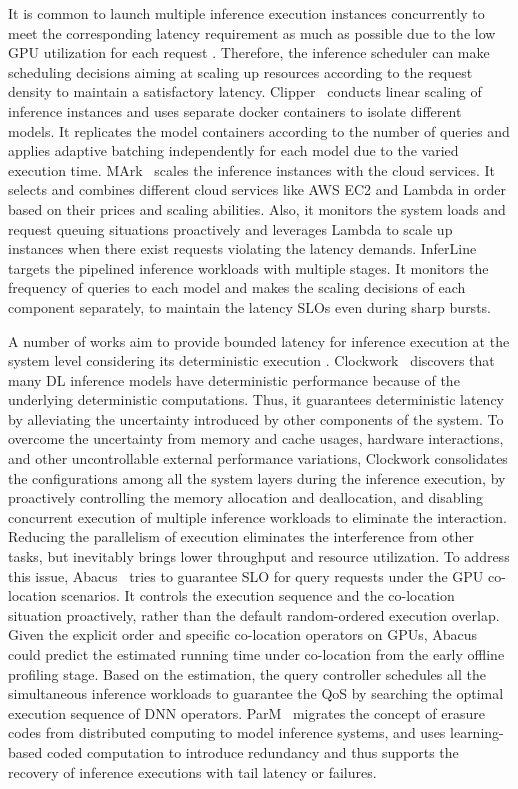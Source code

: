 It is common to launch multiple inference execution instances concurrently to meet the corresponding latency requirement as much as possible due to the low GPU utilization for each request {\tiny{}}. Therefore, the inference scheduler can make scheduling decisions aiming at scaling up resources according to the request density to maintain a satisfactory latency.
Clipper~\cite{Daniel2017clipper} conducts linear scaling of inference instances and uses separate docker containers to isolate different models. It replicates the model containers according to the number of queries and applies adaptive batching independently for each model due to the varied execution time.
MArk~\cite{zhang2019mark,zhang2020mark} scales the inference instances with the cloud services. It selects and combines different cloud services like AWS EC2 and Lambda in order based on their prices and scaling abilities. Also, it monitors the system loads and request queuing situations proactively and leverages Lambda to scale up instances when there exist requests violating the latency demands. InferLine~\cite{crankshaw2020inferline} targets the pipelined inference workloads with multiple stages.
It monitors the frequency of queries to each model and makes the scaling decisions of each component separately, to maintain the latency SLOs even during sharp bursts.



A number of works aim to provide bounded latency for inference execution at the system level considering its deterministic execution {\tiny{}}. Clockwork~\cite{Arpan2020clockwork} discovers that many DL inference models have deterministic performance because of the underlying deterministic computations. Thus, it guarantees deterministic latency by alleviating the uncertainty introduced by other components of the system. To overcome the uncertainty from memory and cache usages, hardware interactions, and other uncontrollable external performance variations, Clockwork consolidates the configurations among all the system layers during the inference execution, by proactively controlling the memory allocation and deallocation, and disabling concurrent execution of multiple inference workloads to eliminate the interaction.
Reducing the parallelism of execution eliminates the interference from other tasks, but inevitably brings lower throughput and resource utilization. To address this issue, Abacus~\cite{cui2021abacus} tries to guarantee SLO for query requests under the GPU co-location scenarios. It controls the execution sequence and the co-location situation proactively, rather than the default random-ordered execution overlap. Given the explicit order and specific co-location operators on GPUs, Abacus could predict the estimated running time under co-location from the early offline profiling stage. Based on the estimation, the query controller schedules all the simultaneous inference workloads to guarantee the QoS by searching the optimal execution sequence of DNN operators. ParM~\cite{Kosaian2019parity} migrates the concept of erasure codes from distributed computing to model inference systems, and uses learning-based coded computation to introduce redundancy and thus supports the recovery of inference executions with tail latency or failures.

